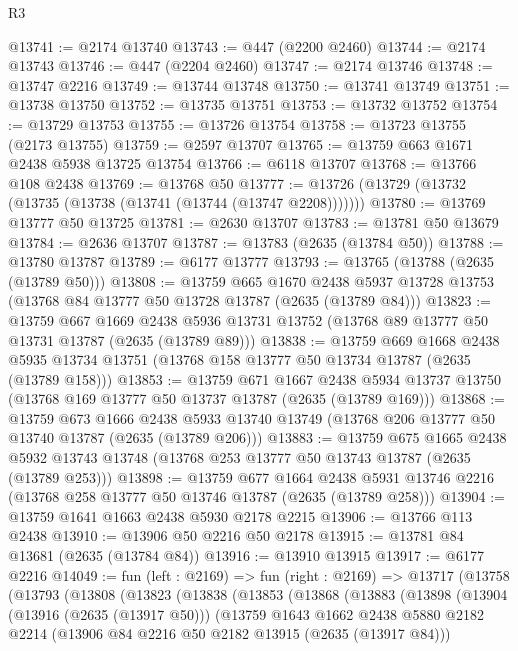 \begin{lexlean}{R3}
\begin{coremodule}
@13741 := @2174 @13740
@13743 := @447 (@2200 @2460)
@13744 := @2174 @13743
@13746 := @447 (@2204 @2460)
@13747 := @2174 @13746
@13748 := @13747 @2216
@13749 := @13744 @13748
@13750 := @13741 @13749
@13751 := @13738 @13750
@13752 := @13735 @13751
@13753 := @13732 @13752
@13754 := @13729 @13753
@13755 := @13726 @13754
@13758 := @13723 @13755 (@2173 @13755)
@13759 := @2597 @13707
@13765 := @13759 @663 @1671 @2438 @5938 @13725 @13754
@13766 := @6118 @13707
@13768 := @13766 @108 @2438
@13769 := @13768 @50
@13777 := @13726 (@13729 (@13732 (@13735 (@13738 (@13741 (@13744 (@13747 @2208)))))))
@13780 := @13769 @13777 @50 @13725
@13781 := @2630 @13707
@13783 := @13781 @50 @13679
@13784 := @2636 @13707
@13787 := @13783 (@2635 (@13784 @50))
@13788 := @13780 @13787
@13789 := @6177 @13777
@13793 := @13765 (@13788 (@2635 (@13789 @50)))
@13808 := @13759
    @665
    @1670
    @2438
    @5937
    @13728
    @13753
    (@13768 @84 @13777 @50 @13728 @13787 (@2635 (@13789 @84)))
@13823 := @13759
    @667
    @1669
    @2438
    @5936
    @13731
    @13752
    (@13768 @89 @13777 @50 @13731 @13787 (@2635 (@13789 @89)))
@13838 := @13759
    @669
    @1668
    @2438
    @5935
    @13734
    @13751
    (@13768 @158 @13777 @50 @13734 @13787 (@2635 (@13789 @158)))
@13853 := @13759
    @671
    @1667
    @2438
    @5934
    @13737
    @13750
    (@13768 @169 @13777 @50 @13737 @13787 (@2635 (@13789 @169)))
@13868 := @13759
    @673
    @1666
    @2438
    @5933
    @13740
    @13749
    (@13768 @206 @13777 @50 @13740 @13787 (@2635 (@13789 @206)))
@13883 := @13759
    @675
    @1665
    @2438
    @5932
    @13743
    @13748
    (@13768 @253 @13777 @50 @13743 @13787 (@2635 (@13789 @253)))
@13898 := @13759
    @677
    @1664
    @2438
    @5931
    @13746
    @2216
    (@13768 @258 @13777 @50 @13746 @13787 (@2635 (@13789 @258)))
@13904 := @13759 @1641 @1663 @2438 @5930 @2178 @2215
@13906 := @13766 @113 @2438
@13910 := @13906 @50 @2216 @50 @2178
@13915 := @13781 @84 @13681 (@2635 (@13784 @84))
@13916 := @13910 @13915
@13917 := @6177 @2216
@14049 := fun (left : @2169) =>
  fun (right : @2169) =>
  @13717
    (@13758
      (@13793
        (@13808
          (@13823
            (@13838
              (@13853
                (@13868
                  (@13883
                    (@13898
                      (@13904
                        (@13916 (@2635 (@13917 @50)))
                        (@13759
                          @1643
                          @1662
                          @2438
                          @5880
                          @2182
                          @2214
                          (@13906 @84 @2216 @50 @2182 @13915 (@2635 (@13917 @84)))

\end{coremodule}
\end{lexlean}

